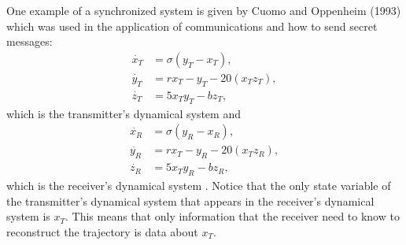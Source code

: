 \documentclass[12pt]{article}
\begin{document}
      One example of a synchronized system is given by Cuomo and Oppenheim (1993) which was used in the application of communications and how to send secret messages: 
      \begin{equation}\label{eq:transmitter}
      \begin{aligned}
        \dot{x_T} &= \sigma (y_T-x_T), \\
        \dot{y_T} &= r  x_T - y_T - 20 (x_T   z_T),\\
        \dot{z_T} &= 5 x_T y_T - b  z_T,
      \end{aligned}
    \end{equation} 
    which is the transmitter's dynamical system and 
    \begin{equation}\label{eq:receiver}
      \begin{aligned}
        \dot{x_R} &= \sigma (y_R-x_R), \\
        \dot{y_R} &= r  x_T - y_R - 20 (x_T   z_R),\\
        \dot{z_R} &= 5 x_T y_R - b  z_R,
      \end{aligned}
    \end{equation}
    which is the receiver's dynamical system \cite{cuomo1993}. Notice that the only state variable of the transmitter's dynamical system that appears in the receiver's dynamical system is $x_T$. This means that only information that the receiver need to know to reconstruct the trajectory is data about $x_T$.  
\end{document}
